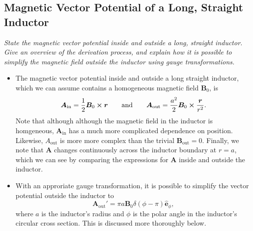 \documentclass[11pt, a4paper]{article}
\renewcommand{\vec}[1]{\bm{#1}} %
\newcommand{\uvec}[1]{\hat{\vec{#1}}} %
\renewcommand{\r}{\vec{r}}
\newcommand{\B}{\vec{B}} %
\newcommand{\A}{\vec{A}} %
\begin{document}
\subsection{Magnetic Vector Potential of a Long, Straight Inductor}
\textit{State the magnetic vector potential inside and outside a long, straight inductor. Give an overview of the derivation process, and explain how it is possible to simplify the magnetic field outside the inductor using gauge transformations.}

\begin{itemize}
    \item The magnetic vector potential inside and outside a long straight inductor, which we can assume contains a homogeneous magnetic field $ \B_{0} $, is
    \begin{equation*}
        \A_{\text{in}} = \frac{1}{2} \B_{0} \cross \r \qquad \text{and} \qquad \A_{\text{out}} = \frac{a^{2}}{2}\B_{0} \cross \frac{\r}{r^{2}}.
    \end{equation*}
     Note that although although the magnetic field in the inductor is homgeneous, $ \A_{\text{in}} $ has a much more complicated dependence on position. Likewise, $ A_{\text{out}} $ is more more complex than the trivial $ \B_{\text{out}} = 0 $. Finally, we note that $ \A $ changes continuously across the inductor boundary at $ r = a $, which we can see by comparing the expressions for $ \A $ inside and outside the inductor.

     \item With an approriate gauge transformation, it is possible to simplify the vector potential outside the inductor to
     \begin{equation*}
         \A_{\text{out}}' = \pi a \B_{0} \delta(\phi - \pi) \uvec{e}_{\phi},
     \end{equation*}
     where $ a $ is the inductor's radius and $ \phi $ is the polar angle in the inductor's circular cross section. This is discussed more thoroughly below.
    
\end{itemize}
\end{document}

